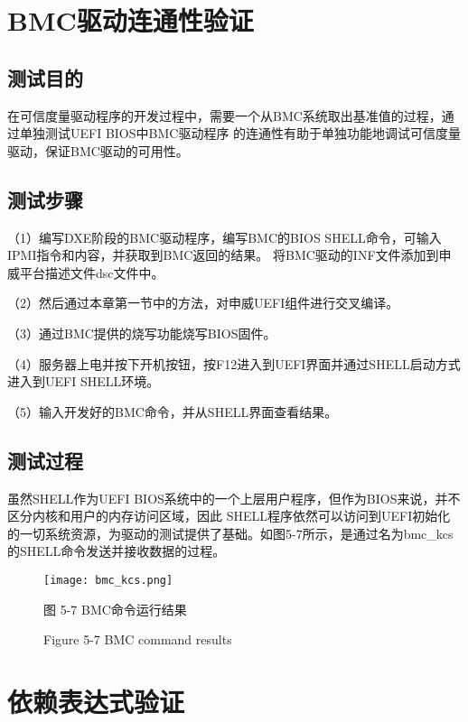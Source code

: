 %
%
\section{BMC驱动连通性验证}

\subsection{测试目的}
在可信度量驱动程序的开发过程中，需要一个从BMC系统取出基准值的过程，通过单独测试UEFI BIOS中BMC驱动程序
的连通性有助于单独功能地调试可信度量驱动，保证BMC驱动的可用性。

\subsection{测试步骤}
（1）编写DXE阶段的BMC驱动程序，编写BMC的BIOS SHELL命令，可输入IPMI指令和内容，并获取到BMC返回的结果。
将BMC驱动的INF文件添加到申威平台描述文件dsc文件中。
\par （2）然后通过本章第一节中的方法，对申威UEFI组件进行交叉编译。
\par （3）通过BMC提供的烧写功能烧写BIOS固件。
\par （4）服务器上电并按下开机按钮，按F12进入到UEFI界面并通过SHELL启动方式进入到UEFI SHELL环境。
\par （5）输入开发好的BMC命令，并从SHELL界面查看结果。

\subsection{测试过程}
虽然SHELL作为UEFI BIOS系统中的一个上层用户程序，但作为BIOS来说，并不区分内核和用户的内存访问区域，因此
SHELL程序依然可以访问到UEFI初始化的一切系统资源，为驱动的测试提供了基础。如图5-7所示，是通过名为bmc\_kcs
的SHELL命令发送并接收数据的过程。

\begin{figure}[H]
    \label{ffs_format}
    \vspace{0cm}   
    \setlength{\abovecaptionskip}{0.3cm}
	\centering
    \texttt{[image: bmc\_kcs.png]}
    \caption*{图 5-7 BMC命令运行结果}
    \setlength{\belowcaptionskip}{-0.7cm}
    \caption*{Figure 5-7 BMC command results}
\end{figure}

%
%
\section{依赖表达式验证}

